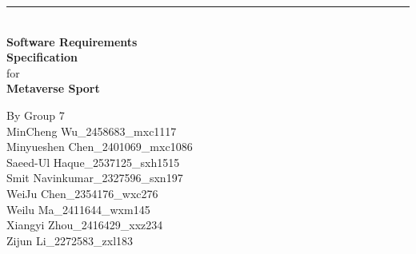 \documentclass[a4paper]{article}
\begin{document}

\begin{titlepage}
	
	\rule{\linewidth}{5pt}
	\raggedleft
	\fontsize{38pt}{50pt}\selectfont
    \textbf{\\Software Requirements\\
    Specification\\}
    \fontsize{28pt}{60pt}\selectfont 
    for\\
    \fontsize{38pt}{60pt}\selectfont 
    \textbf{Metaverse Sport\\}
	
	\vfill %
	
	
	\parbox[t]{0.93\textwidth}{ %
		\raggedleft %
		\large %
		{\Large By Group 7}\\[4pt] %
		MinCheng Wu\_2458683\_mxc1117\\
		Minyueshen Chen\_2401069\_mxc1086\\
		Saeed-Ul Haque\_2537125\_sxh1515\\
		Smit Navinkumar\_2327596\_sxn197\\
		WeiJu Chen\_2354176\_wxc276\\
		Weilu Ma\_2411644\_wxm145\\
		Xiangyi Zhou\_2416429\_xxz234\\
		Zijun Li\_2272583\_zxl183\\
	}
	
\end{titlepage}

    \begin{center}
	\tableofcontents
	\end{center}
    \newpage

	
\end{document}
